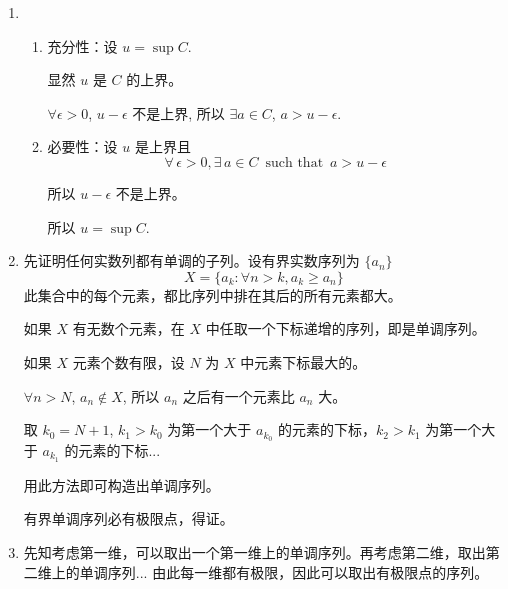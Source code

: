 \documentclass[11pt,letter,notitlepage]{article}
\theoremstyle{definition}
\begin{document}
\begin{solution}
	\begin{enumerate}
		\item \begin{enumerate}
			      \item 充分性：设 $u=\sup C$.

			            显然 $u$ 是 $C$ 的上界。

			            $\forall \epsilon>0$, $u-\epsilon$ 不是上界, 所以 $\exists a\in C$, $a>u-\epsilon$.
			      \item 必要性：设 $u$ 是上界且
			            $$\forall\,\epsilon>0,\exists\,a \in C\,\text{ such that }\,a>u-\epsilon$$

			            所以 $u-\epsilon$ 不是上界。

			            所以 $u=\sup C$.
		      \end{enumerate}
		\item 先证明任何实数列都有单调的子列。设有界实数序列为 $\{a_n\}$
		      $$X=\{a_k: \forall n>k,a_k\geq a_n\}$$
		      此集合中的每个元素，都比序列中排在其后的所有元素都大。

		      如果 $X$ 有无数个元素，在 $X$ 中任取一个下标递增的序列，即是单调序列。

		      如果 $X$ 元素个数有限，设 $N$ 为 $X$ 中元素下标最大的。

		      $\forall n>N$, $a_n \notin X$, 所以 $a_n$ 之后有一个元素比 $a_n$ 大。

		      取 $k_0=N+1$, $k_1>k_0$ 为第一个大于 $a_{k_0}$ 的元素的下标，$k_2>k_1$ 为第一个大于 $a_{k_1}$ 的元素的下标...

		      用此方法即可构造出单调序列。

		      有界单调序列必有极限点，得证。

		\item 先知考虑第一维，可以取出一个第一维上的单调序列。再考虑第二维，取出第二维上的单调序列... 由此每一维都有极限，因此可以取出有极限点的序列。
	\end{enumerate}
\end{solution}

\newpage
\end{document}
